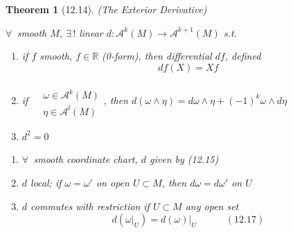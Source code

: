 \documentclass[11pt]{amsart}
\newtheorem{theorem}{Theorem}
\theoremstyle{definition}
\begin{document}
\begin{theorem}[12.14] (The Exterior Derivative)

$\forall \, $ smooth $M$, $\exists \, !$ linear $d: \mathcal{A}^k(M) \to \mathcal{A}^{k+1}(M)$ s.t.
\begin{enumerate}
\item[(i)] if $f$ smooth, $f\in \mathbb{R}$ (0-form), then differential $df$, defined
\[
df(X) = Xf
\]
\item[(ii)] if $\begin{aligned} & \quad \\ & \omega \in \mathcal{A}^k(M) \\ & \eta \in \mathcal{A}^l(M) \end{aligned}$, then $d(\omega \wedge \eta) = d\omega \wedge \eta + (-1)^k \omega \wedge d\eta $
\item[(iii)] $d^2 =0$
\end{enumerate}
\begin{enumerate}
  \item[(a)] $\forall \, $ smooth coordinate chart, $d$ given by (12.15)
  \item[(b)] $d$ local; if $\omega = \omega'$ on open $U \subset M$, then $d\omega = d\omega'$ on $U$
  \item[(c)] $d$ commutes with restriction if $U \subset M$ any open set
    \begin{equation}
      d(\left. \omega \right|_U ) = \left. d(\omega ) \right|_U \quad \quad \quad (12.17)
    \end{equation}
\end{enumerate}
\end{theorem}
\end{document}

